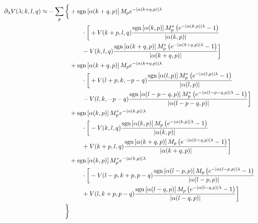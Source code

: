 \begin{align*}
	\partial_{\lambda} V(\lambda; k, l, q) \approx - \sum_{p} \bigg\{ &+\operatorname{sgn} \left[\alpha (k+q, p)\right] M_{p} e^{ - | \alpha (k+q,p) | \lambda }\\
		&\qquad\cdot\bigg[  + V(k+p, l, q) \frac{\operatorname{sgn} \left[ \alpha (k, p) \right] M_{p}^* \left(  e^{ - | \alpha (k,p) | \lambda } - 1 \right)}{|\alpha (k, p)|}\\
		&\qquad - V(k, l, q) \frac{\operatorname{sgn} \left[ \alpha (k+q, p) \right] M_{p}^* \left(  e^{ - | \alpha (k+q,p) | \lambda } - 1 \right)}{|\alpha (k+q, p)|} \bigg]\\
	&+\operatorname{sgn} \left[\alpha (k+q, p)\right] M_{p} e^{ - | \alpha (k+q,p) | \lambda }\\
		&\qquad\cdot\bigg[  + V(l+p, k, -p-q) \frac{\operatorname{sgn} \left[ \alpha (l, p) \right] M_{p}^* \left(  e^{ - | \alpha (l,p) | \lambda } - 1 \right)}{|\alpha (l, p)|}\\
		&\qquad - V(l, k, -p-q) \frac{\operatorname{sgn} \left[ \alpha (l-p-q, p) \right] M_{p}^* \left(  e^{ - | \alpha (l-p-q,p) | \lambda } - 1 \right)}{|\alpha (l-p-q, p)|} \bigg]\\
	&+\operatorname{sgn} \left[ \alpha (k, p) \right] M_{p}^* e^{ - | \alpha (k,p) | \lambda }\\
		&\qquad\cdot\bigg[  - V(k, l, q) \frac{\operatorname{sgn} \left[\alpha (k, p)\right] M_{p} \left(  e^{ - | \alpha (k,p) | \lambda } - 1 \right)}{|\alpha (k, p)|}\\
		&\qquad + V(k+p, l, q) \frac{\operatorname{sgn} \left[\alpha (k+q, p)\right] M_{p} \left(  e^{ - | \alpha (k+q,p) | \lambda } - 1 \right)}{|\alpha (k+q, p)|} \bigg]\\
	&+\operatorname{sgn} \left[ \alpha (k, p) \right] M_{p}^* e^{ - | \alpha (k,p) | \lambda }\\
		&\qquad\cdot\bigg[  - V(l-p, k+p, p-q) \frac{\operatorname{sgn} \left[\alpha (l-p, p)\right] M_{p} \left(  e^{ - | \alpha (l-p,p) | \lambda } - 1 \right)}{|\alpha (l-p, p)|}\\
		&\qquad + V(l, k+p, p-q) \frac{\operatorname{sgn} \left[\alpha (l-q, p)\right] M_{p} \left(  e^{ - | \alpha (l-q,p) | \lambda } - 1 \right)}{|\alpha (l-q, p)|} \bigg]\\
	 \bigg\}
\end{align*}

